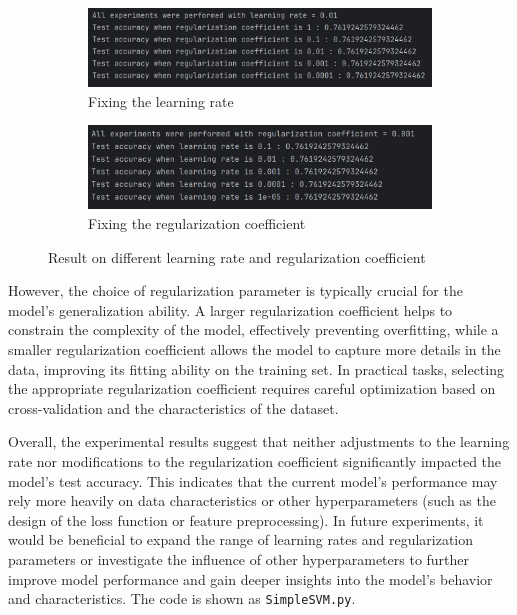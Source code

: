 \documentclass[a4paper, utf8]{ctexart}
\begin{document}
	\begin{figure}[htbp]
		\centering
		\begin{subfigure}{.5\textwidth}
			\centering
			\includegraphics[height=.063\textheight]{./figure/myplotS12.png}
			\caption{Fixing the learning rate}
		\end{subfigure}
		\begin{subfigure}{.45\textwidth}
			\centering
			\includegraphics[height=.063\textheight]{./figure/myplotS13.png}
			\caption{Fixing the regularization coefficient}
		\end{subfigure}
		\caption{Result on different learning rate and regularization coefficient}
	\end{figure}
	
	However, the choice of regularization parameter is typically crucial for the model's generalization ability. A larger regularization coefficient helps to constrain the complexity of the model, effectively preventing overfitting, while a smaller regularization coefficient allows the model to capture more details in the data, improving its fitting ability on the training set. In practical tasks, selecting the appropriate regularization coefficient requires careful optimization based on cross-validation and the characteristics of the dataset.
	
	Overall, the experimental results suggest that neither adjustments to the learning rate nor modifications to the regularization coefficient significantly impacted the model's test accuracy. This indicates that the current model's performance may rely more heavily on data characteristics or other hyperparameters (such as the design of the loss function or feature preprocessing). In future experiments, it would be beneficial to expand the range of learning rates and regularization parameters or investigate the influence of other hyperparameters to further improve model performance and gain deeper insights into the model's behavior and characteristics. The code is shown as \verb|SimpleSVM.py|.
	
\end{document}
